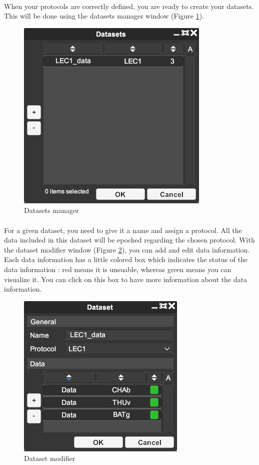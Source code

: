 \documentclass[a4paper]{article}
\begin{document}
\paragraph{} When your protocols are correctly defined, you are ready to create your datasets. This will be done using the datasets manager window (Figure \ref{datasetGestionUI}).
\begin{figure}[H]
\begin{center}
\includegraphics[scale=0.5]{DatasetGestion.png}
\end{center}
\caption{\label{datasetGestionUI}Datasets manager}
\end{figure}
\paragraph{} For a given dataset, you need to give it a name and assign a protocol. All the data included in this dataset will be epoched regarding the chosen protocol. With the dataset modifier window (Figure \ref{datasetModifierUI}), you can add and edit data information. Each data information has a little colored box which indicates the status of the data information : red means it is unsuable, whereas green means you can visualize it. You can click on this box to have more information about the data information.
\begin{figure}[H]
\begin{center}
\includegraphics[scale=0.5]{DatasetModifier.png}
\end{center}
\caption{\label{datasetModifierUI}Dataset modifier}
\end{figure}
\end{document}
